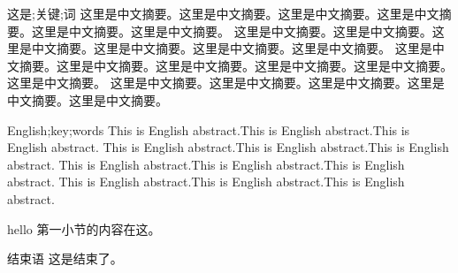\documentclass{ahnuthesis}
\begin{document}
\begin{ahnuabstract}{这是;关键;词}
这里是中文摘要。这里是中文摘要。这里是中文摘要。这里是中文摘要。这里是中文摘要。这里是中文摘要。
这里是中文摘要。这里是中文摘要。这里是中文摘要。这里是中文摘要。这里是中文摘要。这里是中文摘要。
这里是中文摘要。这里是中文摘要。这里是中文摘要。这里是中文摘要。这里是中文摘要。这里是中文摘要。
这里是中文摘要。这里是中文摘要。这里是中文摘要。这里是中文摘要。这里是中文摘要。
\end{ahnuabstract}
\begin{ahnueabstract}{English;key;words}
    This is English abstract.This is English abstract.This is English abstract.
    This is English abstract.This is English abstract.This is English abstract.
    This is English abstract.This is English abstract.This is English abstract.
    This is English abstract.This is English abstract.This is English abstract.
\end{ahnueabstract}
hello\cite{hall1968effect}
\hfill 第一小节的内容在这。\hfill
\begin{mysection}{结束语}
    这是结束了。
\end{mysection}
\end{document}
